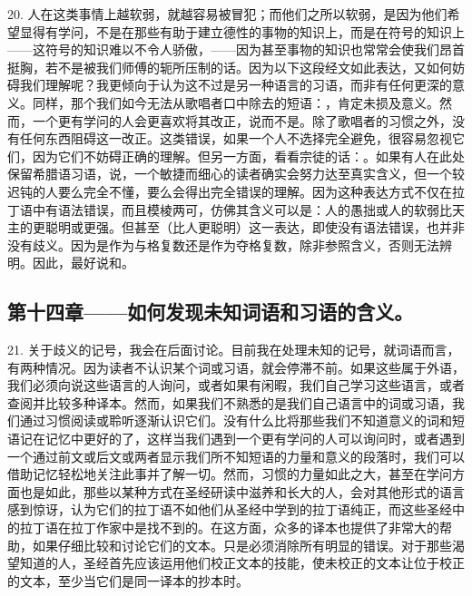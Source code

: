 20. 人在这类事情上越软弱，就越容易被冒犯；而他们之所以软弱，是因为他们希望显得有学问，不是在那些有助于建立德性的事物的知识上，而是在符号的知识上——这符号的知识难以不令人骄傲，——因为甚至事物的知识也常常会使我们昂首挺胸，若不是被我们师傅的轭所压制的话。因为以下这段经文如此表达，又如何妨碍我们理解呢？我更倾向于认为这不过是另一种语言的习语，而非有任何更深的意义。同样，那个我们如今无法从歌唱者口中除去的短语：，肯定未损及意义。然而，一个更有学问的人会更喜欢将其改正，说而不是。除了歌唱者的习惯之外，没有任何东西阻碍这一改正。这类错误，如果一个人不选择完全避免，很容易忽视它们，因为它们不妨碍正确的理解。但另一方面，看看宗徒的话：。如果有人在此处保留希腊语习语，说，一个敏捷而细心的读者确实会努力达至真实含义，但一个较迟钝的人要么完全不懂，要么会得出完全错误的理解。因为这种表达方式不仅在拉丁语中有语法错误，而且模棱两可，仿佛其含义可以是：人的愚拙或人的软弱比天主的更聪明或更强。但甚至（比人更聪明）这一表达，即使没有语法错误，也并非没有歧义。因为是作为与格复数还是作为夺格复数，除非参照含义，否则无法辨明。因此，最好说和。\par


\subsection{第十四章——如何发现未知词语和习语的含义。}

21. 关于歧义的记号，我会在后面讨论。目前我在处理未知的记号，就词语而言，有两种情况。因为读者不认识某个词或习语，就会停滞不前。如果这些属于外语，我们必须向说这些语言的人询问，或者如果有闲暇，我们自己学习这些语言，或者查阅并比较多种译本。然而，如果我们不熟悉的是我们自己语言中的词或习语，我们通过习惯阅读或聆听逐渐认识它们。没有什么比将那些我们不知道意义的词和短语记在记忆中更好的了，这样当我们遇到一个更有学问的人可以询问时，或者遇到一个通过前文或后文或两者显示我们所不知短语的力量和意义的段落时，我们可以借助记忆轻松地关注此事并了解一切。然而，习惯的力量如此之大，甚至在学问方面也是如此，那些以某种方式在圣经研读中滋养和长大的人，会对其他形式的语言感到惊讶，认为它们的拉丁语不如他们从圣经中学到的拉丁语纯正，而这些圣经中的拉丁语在拉丁作家中是找不到的。在这方面，众多的译本也提供了非常大的帮助，如果仔细比较和讨论它们的文本。只是必须消除所有明显的错误。对于那些渴望知道的人，圣经首先应该运用他们校正文本的技能，使未校正的文本让位于校正的文本，至少当它们是同一译本的抄本时。\par


